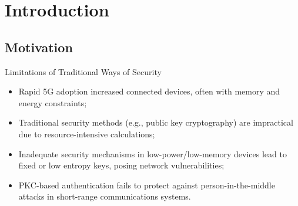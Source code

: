 \section{Introduction}
\subsection{Motivation}
\begin{frame}{Limitations of Traditional Ways of Security}
\begin{itemize}
    \item<1-> Rapid 5G adoption increased connected devices, often with memory and energy constraints;
    \item<2-> Traditional security methods (e.g., public key cryptography) are impractical due to resource-intensive calculations;
    \item<3-> Inadequate security mechanisms in low-power/low-memory devices lead to fixed or low entropy keys, posing network vulnerabilities;
    \item<4-> PKC-based authentication fails to protect against person-in-the-middle attacks in short-range communications systems.
\end{itemize}


    
\end{frame}

